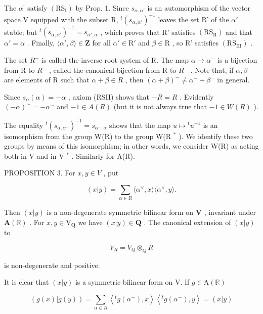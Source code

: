 The \(\alpha^{\prime}\) satisfy \((\mathrm{RS}_{\mathrm{I}})\) by Prop. 1. Since \(s_{\alpha, \alpha'}\) is an automorphism of the vector space V equipped with the subset R, \({}^{t}(s_{\alpha, \alpha'})^{-1}\) leaves the set R' of the \(\alpha'\) stable; but \({}^{t}(s_{\alpha, \alpha'})^{-1} = s_{\alpha', \alpha}\) , which proves that R' satisfies \((\mathrm{RS}_{\mathrm{II}})\) and that \(\alpha' = \alpha\) . Finally, \(\langle \alpha', \beta \rangle \in \mathbf{Z}\) for all \(\alpha' \in \mathrm{R'}\) and \(\beta \in \mathrm{R}\) , so R' satisfies \((\mathrm{RS}_{\mathrm{III}})\) .

The set \(R^{-}\) is called the inverse root system of R. The map \(\alpha \mapsto \alpha^{-}\) is a bijection from R to \(R^{-}\) , called the canonical bijection from R to \(R^{-}\) . Note that, if \(\alpha, \beta\) are elements of R such that \(\alpha + \beta \in R\) , then \((\alpha + \beta)^{-} \neq \alpha^{-} + \beta^{-}\) in general.

Since \(s_{\alpha}(\alpha) = -\alpha\) , axiom (RSII) shows that \(-R = R\) . Evidently \((- \alpha)^{\sim} = -\alpha^{\sim}\) and \(-1 \in A(R)\) (but it is not always true that \(-1 \in W(R)\) ).

The equality \({}^{t}(s_{\alpha,\alpha^{-}})^{-1}=s_{\alpha^{-},\alpha}\) shows that the map \(u\mapsto{}^{t}u^{-1}\) is an isomorphism from the group W(R) to the group W(R \(^{*}\) ). We identify these two groups by means of this isomorphism; in other words, we consider W(R) as acting both in V and in V \(^{*}\) . Similarly for A(R).

PROPOSITION 3. For \(x, y \in V\) , put

\[
(x | y) = \sum_ {\alpha \in R} \langle \alpha^ {\vee}, x \rangle \langle \alpha^ {\vee}, y \rangle .
\]

Then \((x|y)\) is a non-degenerate symmetric bilinear form on \(\mathbf{V}\) , invariant under \(\mathbf{A}(\mathbb{R})\) . For \(x, y \in \mathrm{V}_{\mathbf{Q}}\) we have \((x|y) \in \mathbf{Q}\) . The canonical extension of \((x|y)\) to

\[
V _ {R} = V _ {Q} \otimes_ {Q} R
\]

is non-degenerate and positive.

It is clear that \((x|y)\) is a symmetric bilinear form on V. If \(g\in \mathrm{A}(\mathbb{R})\)

\[
(g (x) | g (y)) = \sum_ {\alpha \in R} \left\langle {} ^ {t} g \left(\alpha^ {-}\right), x \right\rangle \left\langle {} ^ {t} g \left(\alpha^ {-}\right), y \right\rangle = (x | y)
\]


